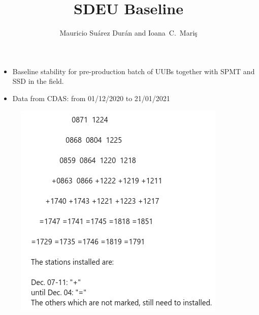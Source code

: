 \documentclass[aspectratio=169]{beamer}
\title{SDEU Baseline}
\author{
  Mauricio Su\'arez Dur\'an and Ioana~C.~Mari\c{s}
}
\institute{IIHE-ULB}
\begin{document}
\begin{frame}
  \titlepage
\end{frame}

\begin{frame}
  \begin{itemize}
    \item Baseline stability for pre-production batch of UUBs together with SPMT and SSD in the field.
    \item Data from CDAS: from 01/12/2020 to 21/01/2021
  \end{itemize}
  \begin{figure}
    \centering
    \includegraphics[width=.35\textwidth]{listStations.png}
  \end{figure}
\end{frame}
\end{document}
